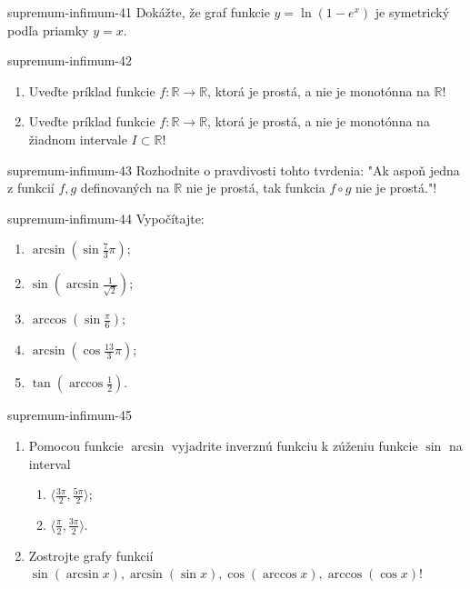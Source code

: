 \begin{defproblem}{supremum-infimum-41}
Dokážte, že graf funkcie $y=\ln (1-e^x)$ je symetrický podľa priamky $y=x$.
\end{defproblem}

\begin{defproblem}{supremum-infimum-42}
\begin{enumerate}
\item Uveďte príklad funkcie $f:\mathbb{R}\rightarrow\mathbb{R}$, ktorá je prostá, a nie je monotónna na $\mathbb{R}$!
\item Uveďte príklad funkcie $f:\mathbb{R}\rightarrow\mathbb{R}$, ktorá je prostá, a nie je monotónna na žiadnom intervale $I\subset\mathbb{R}$!
\end{enumerate}
\end{defproblem}

\begin{defproblem}{supremum-infimum-43}
Rozhodnite o pravdivosti tohto tvrdenia: "Ak aspoň jedna z funkcií $f,g$ definovaných na $\mathbb{R}$ nie je prostá, tak funkcia $f\circ g$ nie je prostá."!
\end{defproblem}

\begin{defproblem}{supremum-infimum-44}
Vypočítajte:
\begin{multicols}{2}
\begin{enumerate}
    \item $\arcsin(\sin \frac{7}{3}\pi)$;
    \item $\sin(\arcsin \frac{1}{\sqrt{2}})$;
    \item $\arccos(\sin \frac{\pi}{6})$;
    \item $\arcsin(\cos \frac{13}{3}\pi)$;
    \item $\tan(\arccos\frac{1}{2})$.
\end{enumerate}
\end{multicols}
\end{defproblem}

\begin{defproblem}{supremum-infimum-45}
\begin{enumerate}
\item Pomocou funkcie $\arcsin$ vyjadrite inverznú funkciu k zúženiu funkcie $\sin$ na interval
\begin{enumerate}
\item $\langle\frac{3\pi}{2},\frac{5\pi}{2}\rangle$;
\item $\langle\frac{\pi}{2},\frac{3\pi}{2}\rangle$.
\end{enumerate}
\item Zostrojte grafy funkcií $\sin(\arcsin x),\arcsin(\sin x),\cos(\arccos x),\arccos(\cos x)$!
\end{enumerate}
\end{defproblem}

